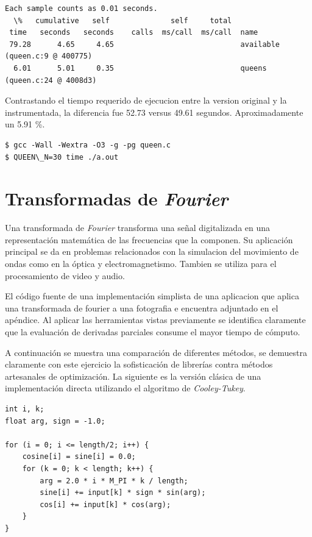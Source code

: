 \documentclass[a4paper]{report}
\begin{document}
\begin{verbatim}
Each sample counts as 0.01 seconds.
  \%   cumulative   self              self     total
 time   seconds   seconds    calls  ms/call  ms/call  name
 79.28      4.65     4.65                             available (queen.c:9 @ 400775)
  6.01      5.01     0.35                             queens (queen.c:24 @ 4008d3)
\end{verbatim}

Contrastando el tiempo requerido de ejecucion entre la version original y la instrumentada,
la diferencia fue 52.73 versus 49.61 segundos. Aproximadamente un 5.91 \%.

\begin{verbatim}
$ gcc -Wall -Wextra -O3 -g -pg queen.c
$ QUEEN\_N=30 time ./a.out
\end{verbatim}

\section{Transformadas de {\it Fourier}}

Una transformada de {\it Fourier} \cite{fourier} transforma una se\~nal
digitalizada en una representaci\'on matem\'atica de las frecuencias que la
componen. Su aplicaci\'on principal se da en problemas relacionados con la simulacion del
movimiento de ondas como en la \'optica y electromagnetismo. Tambien se utiliza para el procesamiento de video y audio.

\bigskip

El c\'odigo fuente de una implementaci\'on simplista de una aplicacion que aplica una transformada de fourier a una fotografia 
e encuentra adjuntado en el ap\'endice. Al aplicar las herramientas vistas previamente se identifica
claramente que la evaluaci\'on de derivadas parciales consume el mayor tiempo
de c\'omputo.

\bigskip

A continuaci\'on se muestra una comparaci\'on de diferentes m\'etodos, se
demuestra claramente con este ejercicio la sofisticaci\'on de librer\'ias
contra m\'etodos artesanales de optimizaci\'on. La siguiente es la versi\'on
cl\'asica de una implementaci\'on directa utilizando el algoritmo de
{\it Cooley-Tukey}.

\begin{verbatim}
int i, k;
float arg, sign = -1.0;

for (i = 0; i <= length/2; i++) {
    cosine[i] = sine[i] = 0.0;
    for (k = 0; k < length; k++) {
        arg = 2.0 * i * M_PI * k / length;
        sine[i] += input[k] * sign * sin(arg);
        cos[i] += input[k] * cos(arg);
    }
}
\end{verbatim}
\end{document}
